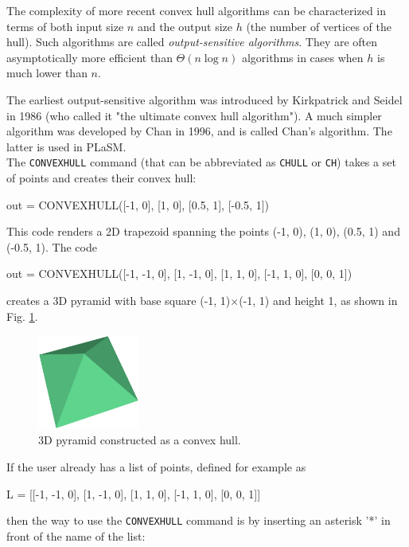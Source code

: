 The complexity of more recent convex hull algorithms can be characterized 
in terms of both input size $n$ and the output size $h$ (the number of vertices
of the hull). Such algorithms are called {\em output-sensitive algorithms}. 
They are often asymptotically more efficient than $Θ(n \log n)$ algorithms 
in cases when $h$ is much lower than $n$. 

The earliest output-sensitive 
algorithm was introduced by Kirkpatrick and Seidel in 1986 (who 
called it "the ultimate convex hull algorithm"). A much simpler algorithm 
was developed by Chan in 1996, and is called Chan's algorithm. The latter
is used in PLaSM. \\

\noindent
The {\tt CONVEXHULL} command (that can be abbreviated as {\tt CHULL} or {\tt CH})
takes a set of points and creates their convex hull:

\begin{bluecode}
out = CONVEXHULL([-1, 0], [1, 0], [0.5, 1], [-0.5, 1])
\end{bluecode}
This code renders a 2D trapezoid spanning the points (-1, 0), (1, 0), (0.5, 1) and 
(-0.5, 1). The code

\begin{bluecode}
out = CONVEXHULL([-1, -1, 0], [1, -1, 0], [1, 1, 0], [-1, 1, 0], 
[0, 0, 1])
\end{bluecode}
creates a 3D pyramid with base square (-1, 1)$\times$(-1, 1) and height 1,
as shown in Fig. \ref{fig:pyra}. 

\begin{figure}[!ht]
\begin{center}
\includegraphics[width=0.3\textwidth]{img/pyra.png}
\end{center}
\vspace{-4mm}
\caption{3D pyramid constructed as a convex hull.}
\label{fig:pyra}
\end{figure}
\noindent
If the user already has a list of points, defined for example as

\begin{bluecode}
L = [[-1, -1, 0], [1, -1, 0], [1, 1, 0], [-1, 1, 0], [0, 0, 1]]
\end{bluecode}
then the way to use the {\tt CONVEXHULL} command is by inserting 
an asterisk '*' in front of the name of the list: 

